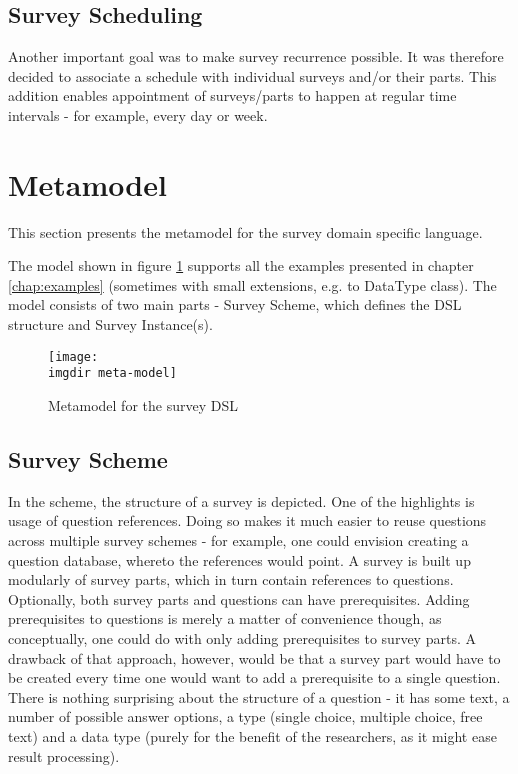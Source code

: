 \subsection{Survey Scheduling}
\label{subsec:scheduling}
Another important goal was to make survey recurrence possible. It was therefore decided to associate a schedule with individual surveys and/or their parts. This addition enables appointment of surveys/parts to happen at regular time intervals - for example, every day or week.

\section{Metamodel}
\label{sec:metamodel}
This section presents the metamodel for the survey domain specific language.  

The model shown in figure \ref{fig:metamodel} supports all the examples presented in chapter \ref{chap:examples} (sometimes with small extensions, e.g. to DataType class).
The model consists of two main parts - Survey Scheme, which defines the DSL structure and Survey Instance(s).

\begin{figure}[!htbp]
  \texttt{[image: \\imgdir meta-model]}
  \caption{Metamodel for the survey DSL}
  \label{fig:metamodel}
\end{figure}

\subsection{Survey Scheme}
\label{subsec:surveyscheme}
In the scheme, the structure of a survey is depicted. One of the highlights is usage of question references. Doing so makes it much easier to reuse questions across multiple survey schemes - for example, one could envision creating a question database, whereto the references would point.
A survey is built up modularly of survey parts, which in turn contain references to questions. Optionally, both survey parts and questions can have prerequisites. Adding prerequisites to questions is merely a matter of convenience though, as conceptually, one could do with only adding prerequisites to survey parts. A drawback of that approach, however, would be that a survey part would have to be created every time one would want to add a prerequisite to a single question.
There is nothing surprising about the structure of a question - it has some text, a number of possible answer options, a type (single choice, multiple choice, free text) and a data type (purely for the benefit of the researchers, as it might ease result processing).

